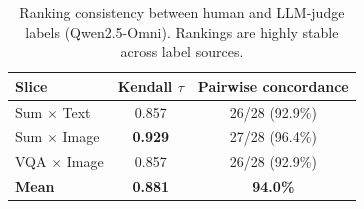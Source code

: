  
\begin{table}[h!]
\label{tab:human}
\centering
\vspace{-5pt}
\renewcommand{\arraystretch}{1.05}
\setlength{\tabcolsep}{4pt}
\scriptsize
\begin{tabular}{l|cc}
\hline
Slice & Kendall $\tau$ & Pairwise concordance \\
\hline
Sum $\times$ Text  & 0.857          & 26/28 (92.9\%) \\
Sum $\times$ Image & \textbf{0.929} & 27/28 (96.4\%) \\
VQA $\times$ Image & 0.857          & 26/28 (92.9\%) \\
\hline
\textbf{Mean} & \textbf{0.881} & \textbf{94.0\%} \\
\hline
\end{tabular}
\vspace{-8pt}
\caption{\scriptsize Ranking consistency between human and LLM-judge labels (Qwen2.5-Omni). Rankings are highly stable across label sources.}
\vspace{-5pt}
\end{table}